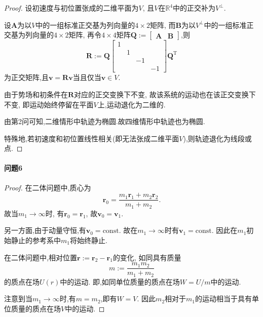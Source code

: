 \documentclass{article}
\newcommand{\nstars}[1]{\multido{}{#1}{$\star$}}
\begin{document}
\begin{proof}

设初速度与初位置张成的二维平面为$V$,
且$V$在$\mathbb R^4$中的正交补为$V^\perp$.

设$\mathbf A$为以$V$中的一组标准正交基为列向量的$4\times2$矩阵,
而$\mathbf B$为以$V^\perp$中的一组标准正交基为列向量的$4\times2$矩阵,
再令$4\times4$矩阵$\mathbf Q:=\left[\begin{matrix}\mathbf A&\mathbf B\end{matrix}\right]$,则
$$\mathbf R:=\mathbf Q\left[\begin{matrix}1\\&1\\&&-1\\&&&-1\end{matrix}\right]\mathbf Q^\mathrm T$$
为正交矩阵,且$\mathbf v=\mathbf R\mathbf v$当且仅当$\mathbf v\in V$.

由于势场和初条件在$\mathbf R$对应的正交变换下不变,
故该系统的运动也在该正交变换下不变,
即运动始终停留在平面$V$上,运动退化为二维的.

由第2问可知,二维情形中轨迹为椭圆.故四维情形中轨迹也为椭圆.

特殊地,若初速度和初位置线性相关(即无法张成二维平面$V$),则轨迹退化为线段或点.

\end{proof}

\paragraph{问题6}\nstars{5}

\begin{proof}

在二体问题中,质心为
$$\mathbf r_0=\frac{m_1\mathbf r_1+m_2\mathbf r_2}{m_1+m_2}.$$
故当$m_1\to\infty$时,
有$\mathbf r_0=\mathbf r_1$,
故$\mathbf v_0=\mathbf v_1$.

另一方面,由于动量守恒,有$\mathbf v_0=\mathrm{const}$.
故在$m_1\to\infty$时有$\mathbf v_1=\mathrm{const}$.
因此在$m_1$初始静止的参考系中$m_1$将始终静止.

在二体问题中,相对位置$\mathbf r:=\mathbf r_2-\mathbf r_1$的变化,
如同具有质量$$m:=\frac{m_1m_2}{m_1+m_2}$$的质点在场$U\left(r\right)$中的运动.
即,如同单位质量的质点在场$W=U/m$中的运动.

注意到当$m_1\to\infty$时,有$m=m_2$,即有$W=V$.
因此$m_2$相对于$m_1$的运动相当于具有单位质量的质点在场$V$中的运动.

\end{proof}
\end{document}

